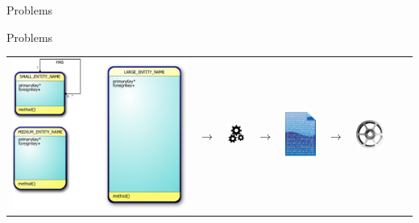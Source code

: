\documentclass[table,15pt,t]{beamer}
\newcommand{\vmiddle}[1]{
  \vspace{\stretch{1}}
  #1
  \vspace{\stretch{1}}
}
\newcommand{\interframe}[1]{
\begin{frame}{}
\vmiddle{\hmiddle{\Huge #1}}
\end{frame}
}
\newcommand{\hmiddle}[1]{
  \begin{center}#1\end{center}
}
\newcounter{i}
\begin{document}
\interframe{Problems}

\begin{frame}{Problems}
  \begin{tabularx}{\textwidth}{ccccccccc}
    \includegraphics[scale=0.06]{figs/model}
    & $\rightarrow$
    & \includegraphics[scale=1]{figs/gears}
    & $\rightarrow$
    & \includegraphics[scale=0.3]{figs/document}
    & $\rightarrow$
    & \includegraphics[scale=0.7]{figs/alloy}

\end{tabularx}
\end{frame}
\end{document}

